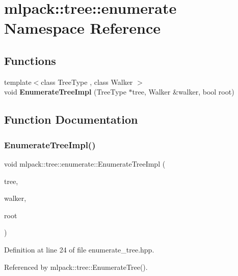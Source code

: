 \section{mlpack\+:\+:tree\+:\+:enumerate Namespace Reference}
\label{namespacemlpack_1_1tree_1_1enumerate}
\subsection*{Functions}
\begin{DoxyCompactItemize}
\item 
{\footnotesize template$<$class Tree\+Type , class Walker $>$ }\\void \textbf{ Enumerate\+Tree\+Impl} (Tree\+Type $\ast$tree, Walker \&walker, bool root)
\end{DoxyCompactItemize}


\subsection{Function Documentation}
\mbox{\label{namespacemlpack_1_1tree_1_1enumerate_a3dd4930ca0f3b9f5779a4efe7e4703ad}} 
\subsubsection{Enumerate\+Tree\+Impl()}
{\footnotesize\ttfamily void mlpack\+::tree\+::enumerate\+::\+Enumerate\+Tree\+Impl (\begin{DoxyParamCaption}\item[{Tree\+Type $\ast$}]{tree,  }\item[{Walker \&}]{walker,  }\item[{bool}]{root }\end{DoxyParamCaption})}



Definition at line 24 of file enumerate\+\_\+tree.\+hpp.



Referenced by mlpack\+::tree\+::\+Enumerate\+Tree().


